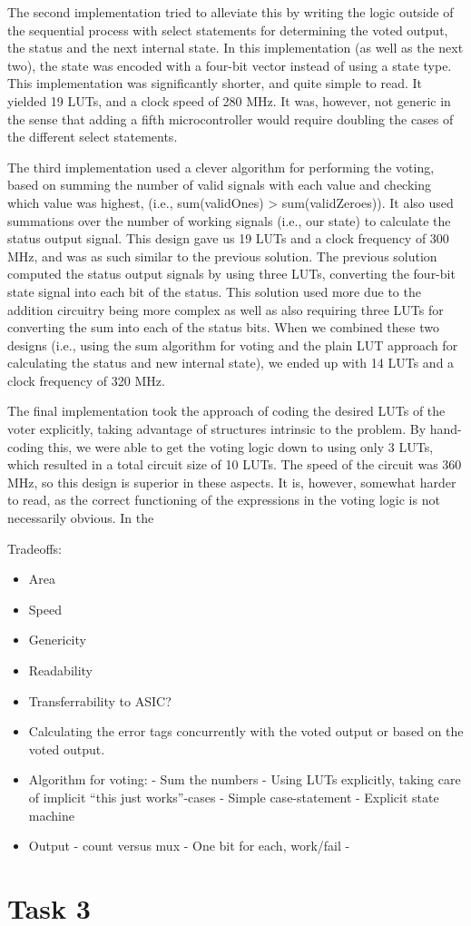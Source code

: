 \documentclass[11pt]{article}
\newcommand{\ie}{i.e.,\xspace}
\begin{document}
The second implementation tried to alleviate this by writing the logic
outside of the sequential process with select statements for
determining the voted output, the status and the next internal
state. In this implementation (as well as the next two), the state was
encoded with a four-bit vector instead of using a state type. This
implementation was significantly shorter, and quite simple to read. It
yielded 19 LUTs, and a clock speed of 280 MHz. It was, however, not
generic in the sense that adding a fifth microcontroller would require
doubling the cases of the different select statements. 

The third implementation used a clever algorithm for performing the
voting, based on summing the number of valid signals with each value
and checking which value was highest, (\ie sum(validOnes) >
sum(validZeroes)). It also used summations over the number of working
signals (\ie our state) to calculate the status output signal. This
design gave us 19 LUTs and a clock frequency of 300 MHz, and was as
such similar to the previous solution. The previous solution computed
the status output signals by using three LUTs, converting the four-bit
state signal into each bit of the status. This solution used more due
to the addition circuitry being more complex as well as also requiring
three LUTs for converting the sum into each of the status bits. When
we combined these two designs (\ie using the sum algorithm for voting
and the plain LUT approach for calculating the status and new internal
state), we ended up with 14 LUTs and a clock frequency of 320 MHz. 

The final implementation took the approach of coding the desired LUTs
of the voter explicitly, taking advantage of structures intrinsic to
the problem. By hand-coding this, we were able to get the voting logic
down to using only 3 LUTs, which resulted in a total circuit size of
10 LUTs. The speed of the circuit was 360 MHz, so this design is
superior in these aspects. It is, however, somewhat harder to read, as
the correct functioning of the expressions in the voting logic is not
necessarily obvious. In the 

Tradeoffs:

\begin{itemize}

\item Area
\item Speed
\item Genericity
\item Readability
\item Transferrability to ASIC?

\item Calculating the error tags concurrently with the voted output or
  based on the voted output.
\item Algorithm for voting:
  - Sum the numbers
  - Using LUTs explicitly, taking care of implicit ``this just works''-cases 
  - Simple case-statement
  - Explicit state machine
\item Output -  count versus mux
  - One bit for each, work/fail
  - 
  

\end{itemize}

\section{Task 3}
\label{sec:task3}
\end{document}
